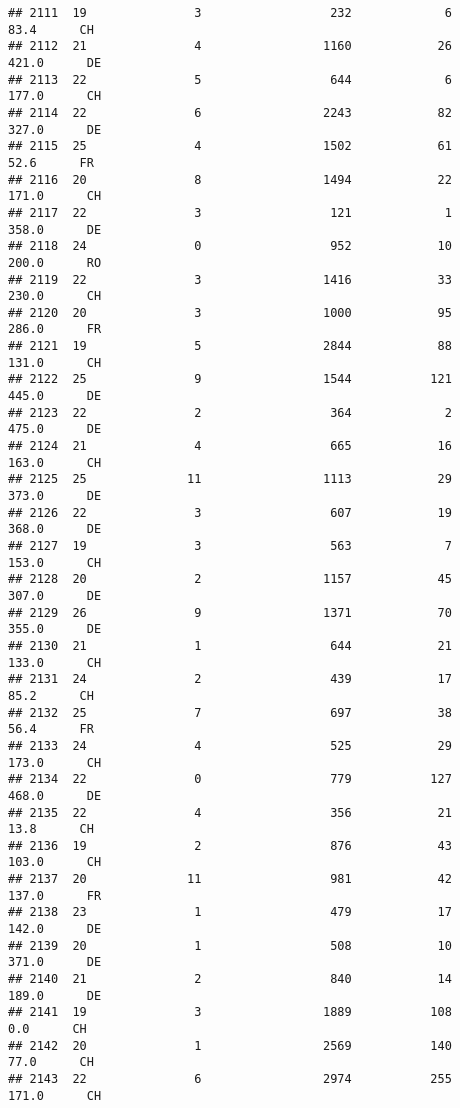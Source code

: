 \documentclass[
]{article}
\begin{document}
\begin{verbatim}
## 2111  19               3                  232             6     83.4      CH
## 2112  21               4                 1160            26    421.0      DE
## 2113  22               5                  644             6    177.0      CH
## 2114  22               6                 2243            82    327.0      DE
## 2115  25               4                 1502            61     52.6      FR
## 2116  20               8                 1494            22    171.0      CH
## 2117  22               3                  121             1    358.0      DE
## 2118  24               0                  952            10    200.0      RO
## 2119  22               3                 1416            33    230.0      CH
## 2120  20               3                 1000            95    286.0      FR
## 2121  19               5                 2844            88    131.0      CH
## 2122  25               9                 1544           121    445.0      DE
## 2123  22               2                  364             2    475.0      DE
## 2124  21               4                  665            16    163.0      CH
## 2125  25              11                 1113            29    373.0      DE
## 2126  22               3                  607            19    368.0      DE
## 2127  19               3                  563             7    153.0      CH
## 2128  20               2                 1157            45    307.0      DE
## 2129  26               9                 1371            70    355.0      DE
## 2130  21               1                  644            21    133.0      CH
## 2131  24               2                  439            17     85.2      CH
## 2132  25               7                  697            38     56.4      FR
## 2133  24               4                  525            29    173.0      CH
## 2134  22               0                  779           127    468.0      DE
## 2135  22               4                  356            21     13.8      CH
## 2136  19               2                  876            43    103.0      CH
## 2137  20              11                  981            42    137.0      FR
## 2138  23               1                  479            17    142.0      DE
## 2139  20               1                  508            10    371.0      DE
## 2140  21               2                  840            14    189.0      DE
## 2141  19               3                 1889           108      0.0      CH
## 2142  20               1                 2569           140     77.0      CH
## 2143  22               6                 2974           255    171.0      CH

\end{verbatim}
\end{document}
